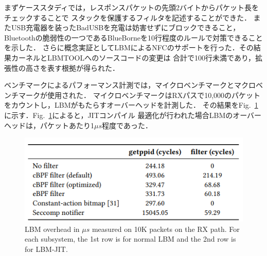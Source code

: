\documentclass[platex,a4j,10pt,twoside,twocolumn,dvipdfmx]{jsarticle}
\newcommand{\Fref}[1]{Fig.~\ref{#1}}
\begin{document}
まずケーススタディでは，レスポンスパケットの先頭2バイトからパケット長をチェックすることで
スタックを保護するフィルタを記述することができた．
またUSB充電器を装ったBadUSBを充電は妨害せずにブロックできること，
Bluetoothの脆弱性の一つであるBlueBorne\cite{BlueBorn43:online}を10行程度のルールで対策できることを示した．
さらに概念実証としてLBMによるNFCのサポートを行った．その結果カーネルとLBMTOOLへのソースコードの変更は
合計で100行未満であり，拡張性の高さを表す根拠が得られた．

ベンチマークによるパフォーマンス計測では，マイクロベンチマークとマクロベンチマークが使用された．
マイクロベンチマークはRXパスで10,000のパケットをカウントし，LBMがもたらすオーバーヘッドを計測した．
その結果を\Fref{img:usb-latency}に示す．\Fref{img:usb-latency}によると，JITコンパイル
最適化が行われた場合LBMのオーバーヘッドは，パケットあたり1$\mu s$程度であった．
\begin{figure}[tp]
  \begin{center}
    \includegraphics[width=\columnwidth]{./img/micro-bench.png}
  \end{center}
  \caption{LBM overhead in $\mu s$ measured on 10K packets on the RX path.
    For each subsystem, the 1st row is for normal LBM and the 2nd row is for LBM-JIT.\cite{tian2019lbm}}
  \label{img:usb-latency}
\end{figure}
\end{document}
